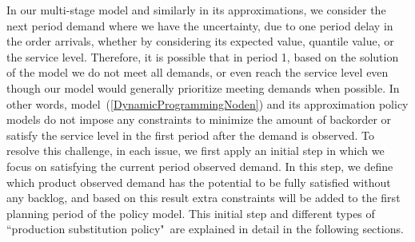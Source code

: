 \documentclass[10pt]{article}
\newcommand{\PSpolicy}{``production substitution policy"}
\begin{document}
In our multi-stage model and similarly in its approximations, we consider the next period demand where we have the uncertainty, due to one period delay in the order arrivals, whether by considering its expected value, quantile value, or the service level.  Therefore, it is possible that in period 1, based on the solution of the model we do not meet all demands, or even reach the service level even though our model would generally prioritize meeting demands when possible.  
In other words, model~(\ref{DynamicProgrammingNoden}) and its approximation policy models do not impose any constraints to minimize the amount of backorder or satisfy the service level in the first period after the demand is observed. 
To resolve this challenge, in each issue, we first apply an initial step in which we focus on satisfying the current period observed demand. 
In this step, we  define which product observed demand has the potential to be fully satisfied without any backlog, and based on this result extra constraints will be added to the first planning period of the policy model. 
This initial step and different types of \PSpolicy \ are explained in detail in the following sections. 
\end{document}
